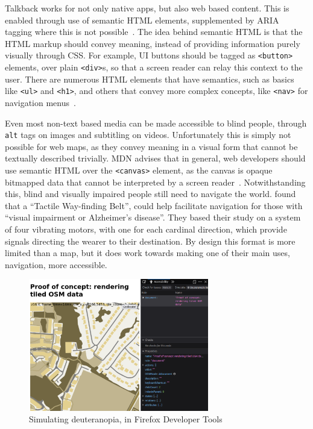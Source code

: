 \documentclass[hyphens]{final_report}
\begin{document}
Talkback works for not only native apps, but also web based content. This is enabled through use of semantic HTML elements, supplemented by ARIA tagging where this is not possible~\cite{w3c-aria}. The idea behind semantic HTML is that the HTML markup should convey meaning, instead of providing information purely visually through CSS\@. For example, UI buttons should be tagged as \texttt{<button>} elements, over plain \texttt{<div>}s, so that a screen reader can relay this context to the user. There are numerous HTML elements that have semantics, such as basics like \texttt{<ul>} and \texttt{<h1>}, and others that convey more complex concepts, like \texttt{<nav>} for navigation menus~\cite{mdn-accessibility-basis}.

Even most non-text based media can be made accessible to blind people, through \texttt{alt} tags on images and subtitling on videos. Unfortunately this is simply not possible for web maps, as they convey meaning in a visual form that cannot be textually described trivially. MDN advises that in general, web developers should use semantic HTML over the \texttt{<canvas>} element, as the canvas is opaque bitmapped data that cannot be interpreted by a screen reader~\cite{mdn-element-reference-canvas}. Notwithstanding this, blind and visually impaired people still need to navigate the world. \textcite{accessible-wayfinding-belt} found that a ``Tactile Way-finding Belt'', could help facilitate navigation for those with ``visual impairment or Alzheimer’s disease''. They based their study on a system of four vibrating motors, with one for each cardinal direction, which provide signals directing the wearer to their destination. By design this format is more limited than a map, but it does work towards making one of their main uses, navigation, more accessible.

\begin{figure}[ht]
    \centering
    \includegraphics[width=0.7\textwidth]{images/simulated-deuteranopia.png}
    \caption{Simulating deuteranopia, in Firefox Developer Tools}\label{fig:deuteranopia}
\end{figure}
\end{document}
